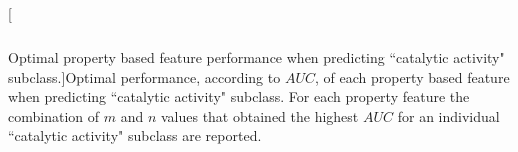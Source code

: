 \begin{table}
\begin{centering}
{\begin{tabular}{|l||rrc||rrc|rrc|rrc|rrc|rrc|rrc||rrc||}
		\hline
				
	\end{tabular}
}

\caption[Optimal property based feature performance when predicting ``catalytic activity" subclass.]{Optimal performance, according to $AUC$, of each property based feature when predicting ``catalytic activity" subclass.  For each property feature the combination of $m$ and $n$ values that obtained the highest $AUC$ for an individual ``catalytic activity" subclass are reported.}

\label{tab:vqgot}

\end{centering}
\end{table}



